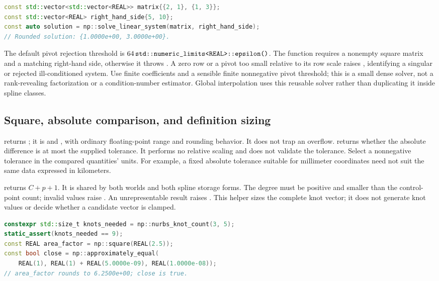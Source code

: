\par\noindent\begin{minipage}{\linewidth}
\begin{lstlisting}[language=C++]
const std::vector<std::vector<REAL>> matrix{{2, 1}, {1, 3}};
const std::vector<REAL> right_hand_side{5, 10};
const auto solution = np::solve_linear_system(matrix, right_hand_side);
// Rounded solution: {1.0000e+00, 3.0000e+00}.
\end{lstlisting}
\end{minipage}\par
The default pivot rejection threshold is
$64\,\api{std::numeric_limits<REAL>::epsilon()}$. The function requires a
nonempty square matrix and a matching right-hand side, otherwise it throws
. A zero row or a pivot too small relative to its
row scale raises , identifying a singular or rejected
ill-conditioned system. Use finite coefficients and a sensible finite
nonnegative pivot threshold; this is a small dense solver, not a rank-revealing
factorization or a condition-number estimator. Global interpolation uses this
reusable solver rather than duplicating it inside spline classes.

\subsection{Square, absolute comparison, and definition sizing}

 returns ; it is  and
, with ordinary floating-point range and rounding behavior.
It does not trap an overflow. 
returns whether the absolute difference is at most the supplied tolerance.
It performs no relative scaling and does not validate the tolerance. Select a
nonnegative tolerance in the compared quantities' units. For example, a fixed
absolute tolerance suitable for millimeter coordinates need not suit the same
data expressed in kilometers.

 returns
$C+p+1$. It is shared by both worlds and both spline storage forms. The degree
must be positive and smaller than the control-point count; invalid values
raise . An unrepresentable result raises
. This helper sizes the complete knot vector; it does
not generate knot values or decide whether a candidate vector is clamped.
\par\noindent\begin{minipage}{\linewidth}
\begin{lstlisting}[language=C++]
constexpr std::size_t knots_needed = np::nurbs_knot_count(3, 5);
static_assert(knots_needed == 9);
const REAL area_factor = np::square(REAL(2.5));
const bool close = np::approximately_equal(
    REAL(1), REAL(1) + REAL(5.0000e-09), REAL(1.0000e-08));
// area_factor rounds to 6.2500e+00; close is true.
\end{lstlisting}
\end{minipage}\par

